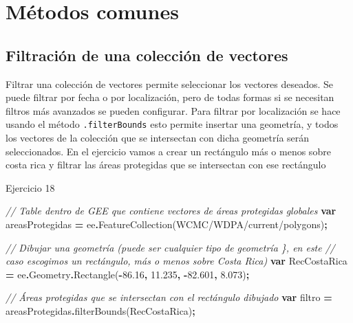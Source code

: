 \documentclass[
  12pt,
  letterpaper,
  twoside]{book}
\newenvironment{Shaded}{\begin{snugshade}}{\end{snugshade}}
\newcommand{\AttributeTok}[1]{\textcolor[rgb]{0.77,0.63,0.00}{#1}}
\newcommand{\CommentTok}[1]{\textcolor[rgb]{0.56,0.35,0.01}{\textit{#1}}}
\newcommand{\FloatTok}[1]{\textcolor[rgb]{0.00,0.00,0.81}{#1}}
\newcommand{\FunctionTok}[1]{\textcolor[rgb]{0.00,0.00,0.00}{#1}}
\newcommand{\KeywordTok}[1]{\textcolor[rgb]{0.13,0.29,0.53}{\textbf{#1}}}
\newcommand{\NormalTok}[1]{#1}
\newcommand{\OperatorTok}[1]{\textcolor[rgb]{0.81,0.36,0.00}{\textbf{#1}}}
\newcommand{\StringTok}[1]{\textcolor[rgb]{0.31,0.60,0.02}{#1}}
\begin{document}
\hypertarget{muxe9todos-comunes-2}{%
\section{Métodos comunes}\label{muxe9todos-comunes-2}}

\hypertarget{filtraciuxf3n-de-una-colecciuxf3n-de-vectores}{%
\subsection{Filtración de una colección de vectores}\label{filtraciuxf3n-de-una-colecciuxf3n-de-vectores}}

Filtrar una colección de vectores permite seleccionar los vectores deseados. Se puede filtrar por fecha o por localización, pero de todas formas si se necesitan filtros más avanzados se pueden configurar. Para filtrar por localización se hace usando el método \texttt{.filterBounds} esto permite insertar una geometría, y todos los vectores de la colección que se intersectan con dicha geometría serán seleccionados. En el ejercicio vamos a crear un rectángulo más o menos sobre costa rica y filtrar las áreas protegidas que se intersectan con ese rectángulo

Ejercicio 18

\begin{Shaded}
\begin{Highlighting}[]
\CommentTok{// Table dentro de GEE que contiene vectores de áreas protegidas globales}
\KeywordTok{var}\NormalTok{ areasProtegidas }\OperatorTok{=}\NormalTok{ ee}\OperatorTok{.}\FunctionTok{FeatureCollection}\NormalTok{(}\StringTok{\textquotesingle{}WCMC/WDPA/current/polygons\textquotesingle{}}\NormalTok{)}\OperatorTok{;} 

\CommentTok{// Dibujar una geometría (puede ser cualquier tipo de geometría \}, en este}
\CommentTok{// caso escogimos un rectángulo, más o menos sobre Costa Rica)}
\KeywordTok{var}\NormalTok{ RecCostaRica }\OperatorTok{=}\NormalTok{ ee}\OperatorTok{.}\AttributeTok{Geometry}\OperatorTok{.}\FunctionTok{Rectangle}\NormalTok{(}\OperatorTok{{-}}\FloatTok{86.16}\OperatorTok{,} \FloatTok{11.235}\OperatorTok{,} \OperatorTok{{-}}\FloatTok{82.601}\OperatorTok{,} \FloatTok{8.073}\NormalTok{)}\OperatorTok{;}

\CommentTok{// Áreas protegidas que se intersectan con el rectángulo dibujado}
\KeywordTok{var}\NormalTok{ filtro }\OperatorTok{=}\NormalTok{ areasProtegidas}\OperatorTok{.}\FunctionTok{filterBounds}\NormalTok{(RecCostaRica)}\OperatorTok{;}
\end{Highlighting}
\end{Shaded}
\end{document}
